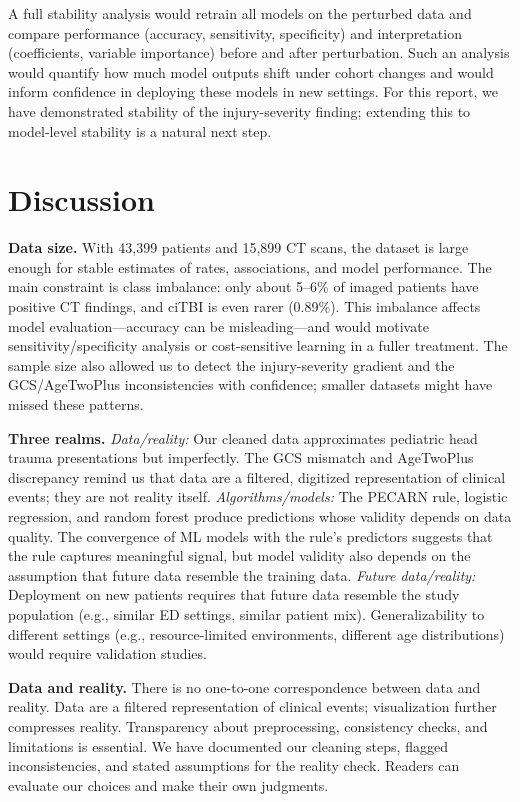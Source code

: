 \documentclass[12ptpt,letterpaper]{article}
\begin{document}
A full stability analysis would retrain all models on the perturbed data and compare performance (accuracy, sensitivity, specificity) and interpretation (coefficients, variable importance) before and after perturbation. Such an analysis would quantify how much model outputs shift under cohort changes and would inform confidence in deploying these models in new settings. For this report, we have demonstrated stability of the injury-severity finding; extending this to model-level stability is a natural next step.

\section{Discussion}\label{discussion}

\textbf{Data size.} With 43,399 patients and 15,899 CT scans, the dataset is large enough for stable estimates of rates, associations, and model performance. The main constraint is class imbalance: only about 5--6\% of imaged patients have positive CT findings, and ciTBI is even rarer (0.89\%). This imbalance affects model evaluation---accuracy can be misleading---and would motivate sensitivity/specificity analysis or cost-sensitive learning in a fuller treatment. The sample size also allowed us to detect the injury-severity gradient and the GCS/AgeTwoPlus inconsistencies with confidence; smaller datasets might have missed these patterns.

\textbf{Three realms.} \textit{Data/reality:} Our cleaned data approximates pediatric head trauma presentations but imperfectly. The GCS mismatch and AgeTwoPlus discrepancy remind us that data are a filtered, digitized representation of clinical events; they are not reality itself. \textit{Algorithms/models:} The PECARN rule, logistic regression, and random forest produce predictions whose validity depends on data quality. The convergence of ML models with the rule's predictors suggests that the rule captures meaningful signal, but model validity also depends on the assumption that future data resemble the training data. \textit{Future data/reality:} Deployment on new patients requires that future data resemble the study population (e.g., similar ED settings, similar patient mix). Generalizability to different settings (e.g., resource-limited environments, different age distributions) would require validation studies.

\textbf{Data and reality.} There is no one-to-one correspondence between data and reality. Data are a filtered representation of clinical events; visualization further compresses reality. Transparency about preprocessing, consistency checks, and limitations is essential. We have documented our cleaning steps, flagged inconsistencies, and stated assumptions for the reality check. Readers can evaluate our choices and make their own judgments.
\end{document}
